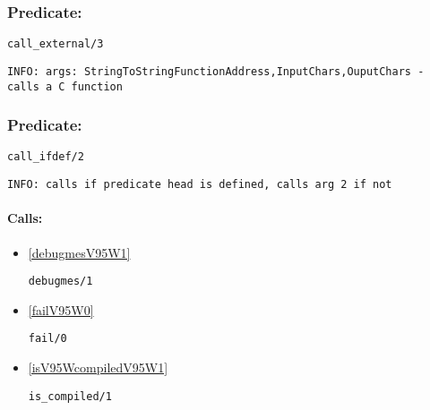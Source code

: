 \subsubsection{Predicate:} \label{callV95WexternalV95W3}

\begin{verbatim}
call_external/3
\end{verbatim}

{\small \begin{verbatim}
INFO: args: StringToStringFunctionAddress,InputChars,OuputChars - calls a C function

\end{verbatim}}

\subsubsection{Predicate:} \label{callV95WifdefV95W2}

\begin{verbatim}
call_ifdef/2
\end{verbatim}

{\small \begin{verbatim}
INFO: calls if predicate head is defined, calls arg 2 if not

\end{verbatim}}
\paragraph{Calls:} 
\begin{itemize}
\item \ref{debugmesV95W1} 
\begin{verbatim}
debugmes/1
\end{verbatim}

\item \ref{failV95W0} 
\begin{verbatim}
fail/0
\end{verbatim}

\item \ref{isV95WcompiledV95W1} 
\begin{verbatim}
is_compiled/1
\end{verbatim}

\end{itemize}
